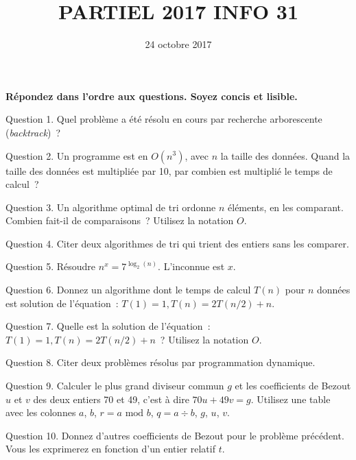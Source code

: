 \documentclass[a4paper,12pt]{article}
\begin{document}
\title{PARTIEL 2017 INFO 31}
\date{24 octobre 2017}
\maketitle
{\bf Répondez dans l'ordre aux questions. Soyez concis et lisible.}

Question 1. Quel problème a été résolu en cours par recherche arborescente ({\it  backtrack})~?


Question 2. Un programme est en $O(n^3)$, avec $n$ la taille des données. Quand la taille des données est multipliée par 10, par combien est multiplié le temps de calcul~?

Question 3. Un algorithme optimal de tri ordonne $n$ éléments, en les comparant. Combien fait-il de comparaisons~? Utilisez la notation $O$. 

Question 4. Citer deux algorithmes de tri qui trient des entiers sans les comparer.



Question 5. Résoudre $n^x=7^{\log_2(n)}$. L'inconnue est $x$.

Question 6. Donnez un algorithme dont le temps de calcul $T(n)$ pour $n$ données
est solution de l'équation~: $T(1)=1, T(n)=2T(n/2)+n$.

Question 7. Quelle est la solution de l'équation~: $T(1)=1, T(n)=2T(n/2)+n$~? Utilisez la notation $O$.

Question 8. Citer deux problèmes résolus par programmation dynamique.

Question 9. Calculer le plus grand diviseur commun $g$ et les coefficients de Bezout $u$ et $v$ des deux entiers 70 et 49, c'est à dire
$70 u + 49v = g$. Utilisez une table avec les colonnes $a$, $b$, $r= a \mbox{ mod } b$, $q=a \div b$, $g$, $u$, $v$.

Question 10. Donnez d'autres coefficients de Bezout pour le problème précédent. Vous les exprimerez en fonction d'un entier relatif $t$.


\end{document}
